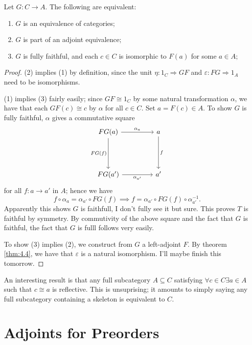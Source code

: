 \begin{theorem}\label{thm:5.4}
	Let $G : C \to A$. The following are equivalent:
	\begin{enumerate}
		\item $G$ is an equivalence of categories;
		\item $G$ is part of an adjoint equivalence;
		\item $G$ is fully faithful, and each $c\in C$ is isomorphic to $F(a)$ for some $a\in A$;
	\end{enumerate}
\end{theorem}
\begin{proof}
	(2) implies (1) by definition, since the unit $\eta : 1_C \Rightarrow GF$ and $\varepsilon : FG \Rightarrow 1_A$ need to be isomorphisms.

	(1) implies (3) fairly easily; since $GF\cong 1_C$ by some natural transformation $\alpha $, we have that each $GF(c)\cong c$ by $\alpha $ for all $c\in C$. Set $a=F(c)\in A$. To show $G$ is fully faithful, $\alpha $ gives a commutative square
	\[\begin{tikzcd}[row sep = 4.5em, column sep = 4.5em]
	FG(a)\ar[" \alpha _a ", r] \ar[" FG(f) "', d]  & a\ar[" f ", d]  \\
	FG(a')\ar[" \alpha _{a'}  "', r]  & a'
	\end{tikzcd}\]
	for all $f : a \to a'$ in $A$; hence we have
	\[
		f\circ \alpha_a = \alpha_{a'} \circ FG(f) \implies f=\alpha_{a'} \circ FG(f)\circ \alpha_{a'} ^{-1} 
	.\]
	Apparently this shows $G$ is faithfull, I don't fully see it but sure. This proves $T$ is faithful by symmetry. By commutivity of the above square and the fact that $G$ is faithful, the fact that $G$ is fulll follows very easily.

	To show (3) implies (2), we construct from $G$ a left-adjoint $F$. By theorem \ref{thm:4.4}, we have that $\varepsilon $ is a natural isomorphism. I'll maybe finish this tomorrow.
\end{proof}

An interesting result is that any full subcategory $A\subseteq C$ satisfying $\forall c\in C \exists a\in A$ such that $c\cong a$ is reflective. This is unsuprising; it amounts to simply saying any full subcategory containing a skeleton is equivalent to $C$.

\section{Adjoints for Preorders}

